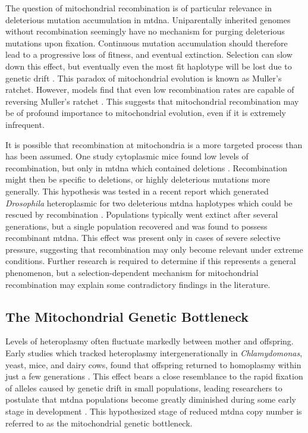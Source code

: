 \documentclass[12pt,twoside]{reedthesis}
\begin{document}
The question of mitochondrial recombination is of particular relevance in deleterious mutation accumulation in \gls{mtdna}.
Uniparentally inherited genomes without recombination seemingly have no mechanism for purging deleterious mutations upon fixation.
Continuous mutation accumulation should therefore lead to a progressive loss of fitness, and eventual extinction.
Selection can slow down this effect, but eventually even the most fit haplotype will be lost due to genetic drift \citep{muller_relation_1964}.
This paradox of mitochondrial evolution is known as Muller's ratchet.
However, models find that even low recombination rates are capable of reversing Muller's ratchet \citep{charlesworth_effect_1993}.
This suggests that mitochondrial recombination may be of profound importance to mitochondrial evolution, even if it is extremely infrequent.

It is possible that recombination at mitochondria is a more targeted process than has been assumed.
One study cytoplasmic mice found low levels of recombination, but only in \gls{mtdna} which contained deletions \citep{sato_rare_2005}.
Recombination might then be specific to deletions, or highly deleterious mutations more generally.
This hypothesis was tested in a recent report which generated \textit{Drosophila} heteroplasmic for two deleterious \gls{mtdna} haplotypes which could be rescued by recombination \citep{ma_selections_2015}.
Populations typically went extinct after several generations, but a single population recovered and was found to possess recombinant \gls{mtdna}.
This effect was present only in cases of severe selective pressure, suggesting that recombination may only become relevant under extreme conditions.
Further research is required to determine if this represents a general phenomenon, but a selection-dependent mechanism for mitochondrial recombination may explain some contradictory findings in the literature.

\subsection{The Mitochondrial Genetic Bottleneck}
Levels of heteroplasmy often fluctuate markedly between mother and offspring.
Early studies which tracked heteroplasmy intergenerationally in \textit{Chlamydomonas}, yeast, mice, and dairy cows, found that offspring returned to homoplasmy within just a few generations \citep{sager_pattern_1968, birky_vegetative_1977, olivo_nucleotide_1983, ashley_rapid_1989, jenuth_random_1996}.
This effect bears a close resemblance to the rapid fixation of alleles caused by genetic drift in small populations, leading researchers to postulate that \gls{mtdna} populations become greatly diminished during some early stage in development \citep{bergstrom_germline_1998}.
This hypothesized stage of reduced \gls{mtdna} copy number is referred to as the mitochondrial genetic bottleneck.
\end{document}
